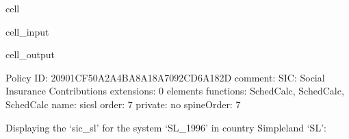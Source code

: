 \documentclass[letterpaper,10pt,english]{sphinxmanual}
\begin{document}
\begin{sphinxuseclass}{cell}
\begin{sphinxuseclass}{cell_input}
\begin{sphinxVerbatim}[commandchars=\\\{\}]
\PYG{p}{[}\PYG{p}{]}\PYG{p}{[}\PYG{p}{]}
\end{sphinxVerbatim}

\end{sphinxuseclass}
\begin{sphinxuseclass}{cell_output}
\begin{sphinxVerbatim}[commandchars=\\\{\}]
\PYGZhy{}\PYGZhy{}\PYGZhy{}\PYGZhy{}\PYGZhy{}\PYGZhy{}\PYGZhy{}\PYGZhy{}\PYGZhy{}\PYGZhy{}\PYGZhy{}\PYGZhy{}\PYGZhy{}\PYGZhy{}\PYGZhy{}\PYGZhy{}\PYGZhy{}\PYGZhy{}\PYGZhy{}\PYGZhy{}\PYGZhy{}\PYGZhy{}\PYGZhy{}\PYGZhy{}\PYGZhy{}\PYGZhy{}\PYGZhy{}\PYGZhy{}\PYGZhy{}\PYGZhy{}
Policy
\PYGZhy{}\PYGZhy{}\PYGZhy{}\PYGZhy{}\PYGZhy{}\PYGZhy{}\PYGZhy{}\PYGZhy{}\PYGZhy{}\PYGZhy{}\PYGZhy{}\PYGZhy{}\PYGZhy{}\PYGZhy{}\PYGZhy{}\PYGZhy{}\PYGZhy{}\PYGZhy{}\PYGZhy{}\PYGZhy{}\PYGZhy{}\PYGZhy{}\PYGZhy{}\PYGZhy{}\PYGZhy{}\PYGZhy{}\PYGZhy{}\PYGZhy{}\PYGZhy{}\PYGZhy{}
	 ID: \PYGZsq{}20901CF5\PYGZhy{}0A2A\PYGZhy{}4BA8\PYGZhy{}A18A\PYGZhy{}7092CD6A182D\PYGZsq{}
	 comment: \PYGZsq{}SIC: Social Insurance Contributions\PYGZsq{}
	 extensions: 0 elements
	 functions: SchedCalc, SchedCalc, SchedCalc
	 name: \PYGZsq{}sic\PYGZus{}sl\PYGZsq{}
	 order: \PYGZsq{}7\PYGZsq{}
	 private: \PYGZsq{}no\PYGZsq{}
	 spineOrder: \PYGZsq{}7\PYGZsq{}
\end{sphinxVerbatim}

\end{sphinxuseclass}
\end{sphinxuseclass}
\sphinxAtStartPar
Displaying the  ‘sic\_sl’ for the system ‘SL\_1996’ in country Simpleland ‘SL’:
\end{document}
